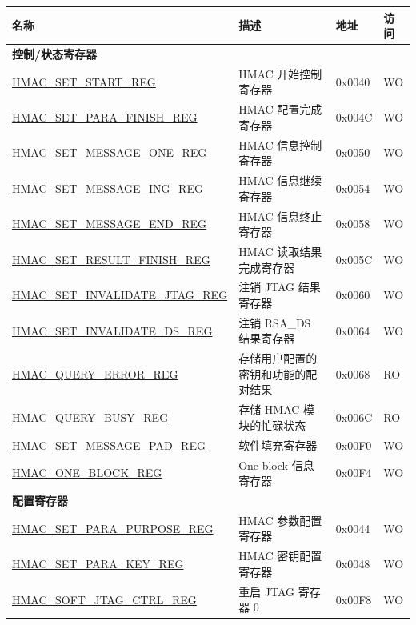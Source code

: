 \begin{longtable}{ | p{6cm} | p{7.2cm} | p{1.3cm} | p{1cm} | }
\hline\rowcolor{lightgray}
名称 & 描述 &  地址 & 访问 \\ \hline
\endhead
\multicolumn{4}{|l|}{\textbf{控制/状态寄存器}} \\ \hline
\hyperref[regdesc:HMACSETSTARTREG]{HMAC\_SET\_START\_REG} & HMAC 开始控制寄存器 & 0x0040 & WO \\ \hline
\hyperref[regdesc:HMACSETPARAFINISHREG]{HMAC\_SET\_PARA\_FINISH\_REG} & HMAC 配置完成寄存器 & 0x004C & WO \\ \hline
\hyperref[regdesc:HMACSETMESSAGEONEREG]{HMAC\_SET\_MESSAGE\_ONE\_REG} & HMAC 信息控制寄存器 & 0x0050 & WO \\ \hline
\hyperref[regdesc:HMACSETMESSAGEINGREG]{HMAC\_SET\_MESSAGE\_ING\_REG} & HMAC 信息继续寄存器 & 0x0054 & WO \\ \hline
\hyperref[regdesc:HMACSETMESSAGEENDREG]{HMAC\_SET\_MESSAGE\_END\_REG} & HMAC 信息终止寄存器 & 0x0058 & WO \\ \hline
\hyperref[regdesc:HMACSETRESULTFINISHREG]{HMAC\_SET\_RESULT\_FINISH\_REG} & HMAC 读取结果完成寄存器 & 0x005C & WO \\ \hline
\hyperref[regdesc:HMACSETINVALIDATEJTAGREG]{HMAC\_SET\_INVALIDATE\_JTAG\_REG} & 注销 JTAG 结果寄存器 & 0x0060 & WO \\ \hline
\hyperref[regdesc:HMACSETINVALIDATEDSREG]{HMAC\_SET\_INVALIDATE\_DS\_REG} & 注销 RSA\_DS 结果寄存器 & 0x0064 & WO \\ \hline
\hyperref[regdesc:HMACQUERYERRORREG]{HMAC\_QUERY\_ERROR\_REG} & 存储用户配置的密钥和功能的配对结果 & 0x0068 & RO \\ \hline
\hyperref[regdesc:HMACQUERYBUSYREG]{HMAC\_QUERY\_BUSY\_REG} & 存储 HMAC 模块的忙碌状态 & 0x006C & RO \\ \hline
\hyperref[regdesc:HMACSETMESSAGEPADREG]{HMAC\_SET\_MESSAGE\_PAD\_REG} & 软件填充寄存器 & 0x00F0 & WO \\ \hline
\hyperref[regdesc:HMACONEBLOCKREG]{HMAC\_ONE\_BLOCK\_REG} & One block 信息寄存器 & 0x00F4 & WO \\ \hline
\multicolumn{4}{|l|}{\textbf{配置寄存器}} \\ \hline
\hyperref[regdesc:HMACSETPARAPURPOSEREG]{HMAC\_SET\_PARA\_PURPOSE\_REG} & HMAC 参数配置寄存器 & 0x0044 & WO \\ \hline
\hyperref[regdesc:HMACSETPARAKEYREG]{HMAC\_SET\_PARA\_KEY\_REG} & HMAC 密钥配置寄存器 & 0x0048 & WO
\\ \hline
\hyperref[regdesc:HMACSOFTJTAGCTRLREG]{HMAC\_SOFT\_JTAG\_CTRL\_REG} & 重启 JTAG 寄存器 0 & 0x00F8 & WO

\end{longtable}

